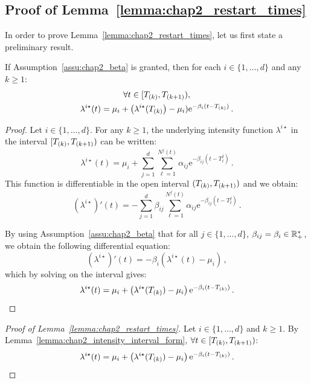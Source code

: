 \begin{subappendices}
    \section{Proof of Lemma~\ref{lemma:chap2_restart_times}} \label{app:chap2_proof_lemma}
    In order to prove Lemma~\ref{lemma:chap2_restart_times}, let us first state a preliminary result.
    
    \begin{lemma}\label{lemma:chap2_intensity_interval_form}
        If Assumption~\ref{assu:chap2_beta} is granted, then for each $i\in\{1,\ldots, d\}$ and any $k\geq 1$:
        \begin{gather*}
            \forall t \in [T\park, T\park[k+1]),
            \\
            \lambda^{i\star}(t) = \mu_i + \left(\lambda^{i\star}(T\park\right) - \mu_i)\mathrm{e}^{-\beta_i(t-T\park)}\,.
        \end{gather*}
      \end{lemma}
  
      \begin{proof}
        Let $i\in\{1,\ldots, d\}$. For any $k\geq 1$, the underlying intensity function $\lambda^{i\star}$ in the interval $[T\park, T\park[k+1])$ can be written:
        \[\lambda^{i\star}(t) = \mu_i + \sum_{j=1}^{d}{\sum_{\ell=1}^{N^j(t)}{\alpha_{ij}\mathrm{e}^{-\beta_{ij}(t-T_\ell^j)}}}\,.\]
        This function is differentiable in the open interval $(T\park, T\park[k+1])$ and we obtain:
        \[(\lambda^{i\star})'(t) = -\sum_{j=1}^{d}{\beta_{ij}\sum_{\ell=1}^{N^j(t)}{\alpha_{ij}\mathrm{e}^{-\beta_{ij}(t-T_\ell^j)}}}\,.\]
  
        By using Assumption~\ref{assu:chap2_beta} that for all $j\in\{1,\ldots, d\}$, $\beta_{ij} = \beta_i\in\RR_+^*$, we obtain the following differential equation:
        \[(\lambda^{i\star})'(t) = -\beta_i\left(\lambda^{i\star}(t) - \mu_i\right)\,,\] which by solving on the interval gives:
        \begin{equation*}
            \lambda^{i\star}(t) = \mu_i + \left(\lambda^{i\star}(T\park) - \mu_i\right)\mathrm{e}^{-\beta_i(t-T\park)}\,.
        \end{equation*}
      \end{proof}
      
      \begin{proof}[Proof of Lemma~\ref{lemma:chap2_restart_times}]
        Let $i\in\{1,\ldots, d\}$ and $k\geq 1$.
        By Lemma~\ref{lemma:chap2_intensity_interval_form}, $\forall t \in [T\park, T\park[k+1])$:
        \begin{equation*}
            \lambda^{i\star}(t) = \mu_i + \left(\lambda^{i\star}(T\park) - \mu_i\right)\mathrm{e}^{-\beta_i(t-T\park)}\,.
        \end{equation*}
  

\end{proof}
\end{subappendices}
